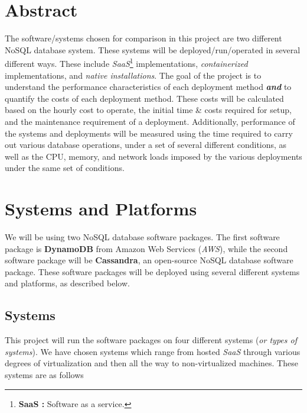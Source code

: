 \documentclass{article}[12pt]
\numberwithin{equation}{section}
\begin{document}
\begin{multicols*}{2}


\section*{Abstract}
\begin{spacing}{1.5}
The software/systems chosen for comparison in this project are two different NoSQL database system.  These systems will be deployed/run/operated in several different ways.  These include \emph{SaaS}\footnote{\textbf{SaaS :} Software as a service.} implementations, \emph{containerized} implementations, and \emph{native installations}.  The goal of the project is to understand the performance characteristics of each deployment method \emph{\textbf{and}} to quantify the costs of each deployment method.  These costs will be calculated based on the hourly cost to operate, the initial time \& costs required for setup, and the maintenance requirement of a deployment.  Additionally, performance of the systems and deployments will be measured using the time required to carry out various database operations, under a set of several different conditions, as well as the CPU, memory, and network loads imposed by the various deployments under the same set of conditions.
\end{spacing}





\section{Systems and Platforms}
\begin{spacing}{1.5}
We will be using two NoSQL database software packages.  The first software package is \textbf{DynamoDB} from Amazon Web Services (\emph{AWS}), while the second software package will be \textbf{Cassandra}, an open-source NoSQL database software package.  These software packages will be deployed using several different systems and platforms, as described below.
\end{spacing}



\subsection{Systems}
\begin{spacing}{1.5}
This project will run the software packages on four different systems (\emph{or types of systems}).  We have chosen systems which range from hosted \emph{SaaS} through various degrees of virtualization and then all the way to non-virtualized machines.  These systems are as follows


\end{spacing}
\end{multicols*}
\end{document}
